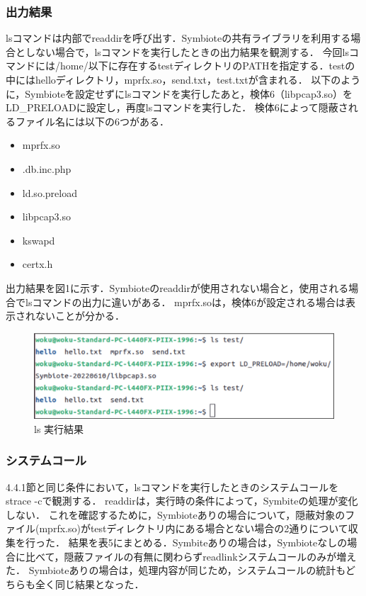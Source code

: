 \documentclass[submit,techreq,noauthor]{eco}	%
\begin{document}
\subsubsection{出力結果}
lsコマンドは内部でreaddirを呼び出す．Symbioteの共有ライブラリを利用する場合としない場合で，lsコマンドを実行したときの出力結果を観測する．
今回lsコマンドには/home/以下に存在するtestディレクトリのPATHを指定する．testの中にはhelloディレクトリ，mprfx.so，send.txt，test.txtが含まれる．
以下のように，Symbioteを設定せずにlsコマンドを実行したあと，検体6（libpcap3.so）をLD\_PRELOADに設定し，再度lsコマンドを実行した．
検体6によって隠蔽されるファイル名には以下の6つがある．
\begin{itemize}
  \item mprfx.so
  \item .db.inc.php
  \item ld.so.preload
  \item libpcap3.so
  \item kswapd
  \item certx.h
\end{itemize}

出力結果を図1に示す．Symbioteのreaddirが使用されない場合と，使用される場合でlsコマンドの出力に違いがある．
mprfx.soは，検体6が設定される場合は表示されないことが分かる．\\

\begin{figure}[t]
	\centering
  \includegraphics[width=12cm]{fig/ls.eps}
	\caption{ls 実行結果}
	\label{fig:ls}
\end{figure}

\subsubsection{システムコール}
4.4.1節と同じ条件において，lsコマンドを実行したときのシステムコールをstrace -cで観測する．
readdirは，実行時の条件によって，Symbiteの処理が変化しない．
これを確認するために，Symbioteありの場合について，隠蔽対象のファイル(mprfx.so)がtestディレクトリ内にある場合とない場合の2通りについて収集を行った．
結果を表5にまとめる．Symbiteありの場合は，Symbioteなしの場合に比べて，隠蔽ファイルの有無に関わらずreadlinkシステムコールのみが増えた．
Symbioteありの場合は，処理内容が同じため，システムコールの統計もどちらも全く同じ結果となった．
\end{document}
